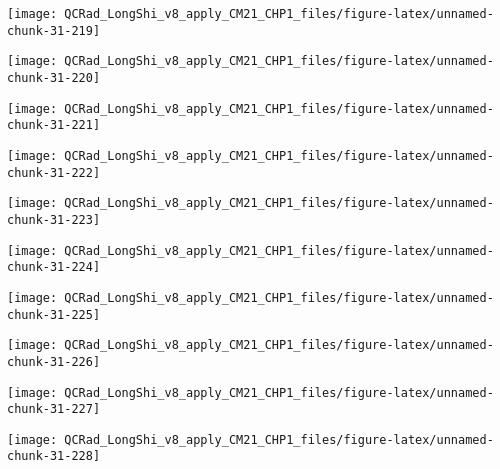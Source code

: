 \documentclass[
  10pt,
  a4paper,oneside]{article}
\begin{document}
\begin{center}\texttt{[image: QCRad\_LongShi\_v8\_apply\_CM21\_CHP1\_files/figure-latex/unnamed-chunk-31-219]} \end{center}

\begin{center}\texttt{[image: QCRad\_LongShi\_v8\_apply\_CM21\_CHP1\_files/figure-latex/unnamed-chunk-31-220]} \end{center}

\begin{center}\texttt{[image: QCRad\_LongShi\_v8\_apply\_CM21\_CHP1\_files/figure-latex/unnamed-chunk-31-221]} \end{center}

\begin{center}\texttt{[image: QCRad\_LongShi\_v8\_apply\_CM21\_CHP1\_files/figure-latex/unnamed-chunk-31-222]} \end{center}

\begin{center}\texttt{[image: QCRad\_LongShi\_v8\_apply\_CM21\_CHP1\_files/figure-latex/unnamed-chunk-31-223]} \end{center}

\begin{center}\texttt{[image: QCRad\_LongShi\_v8\_apply\_CM21\_CHP1\_files/figure-latex/unnamed-chunk-31-224]} \end{center}

\begin{center}\texttt{[image: QCRad\_LongShi\_v8\_apply\_CM21\_CHP1\_files/figure-latex/unnamed-chunk-31-225]} \end{center}

\begin{center}\texttt{[image: QCRad\_LongShi\_v8\_apply\_CM21\_CHP1\_files/figure-latex/unnamed-chunk-31-226]} \end{center}

\begin{center}\texttt{[image: QCRad\_LongShi\_v8\_apply\_CM21\_CHP1\_files/figure-latex/unnamed-chunk-31-227]} \end{center}

\begin{center}\texttt{[image: QCRad\_LongShi\_v8\_apply\_CM21\_CHP1\_files/figure-latex/unnamed-chunk-31-228]} \end{center}
\end{document}
